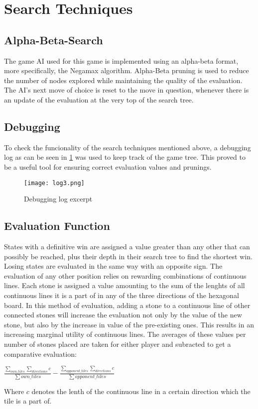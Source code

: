 \section{Search Techniques}

\subsection{Alpha-Beta-Search}
The game AI used for this game is implemented using an alpha-beta format, more specifically, the Negamax algorithm. Alpha-Beta pruning is used to reduce the number of nodes explored while maintaining the quality of the evaluation. The AI's next move of choice is reset to the move in question, whenever there is an update of the evaluation at the very top of the search tree.

\subsection{Debugging}
To check the funcionality of the search techniques mentioned above, a debugging log as can be seen in \ref{fig:debugging} was used to keep track of the game tree. This proved to be a useful tool for ensuring correct evaluation values and prunings.
\begin{figure}[h]
    \centering
    \texttt{[image: log3.png]}
    \caption{Debugging log excerpt}
    \label{fig:debugging}
\end{figure}  

\subsection{Evaluation Function}
States with a definitive win are assigned a value greater than any other that can possibly be reached, plus their depth in their search tree to find the shortest win. Losing states are evaluated in the same way with an opposite sign. The evaluation of any other position relies on rewarding combinations of continuous lines. Each stone is assigned a value amounting to the sum of the lenghts of all continuous lines it is a part of in any of the three directions of the hexagonal board. In this method of evaluation, adding a stone to a continuous line of other connected stones will increase the evaluation not only by the value of the new stone, but also by the increase in value of the pre-existing ones. This results in an increasing marginal utility of continuous lines. The averages of these values per number of stones placed are taken for either player and subracted to get a comparative evaluation:
\begin{center}
    \begin{math}
        \frac{\sum_{own\_tiles}\sum_{directions}c}{\sum{own\_tiles}} 
        - \frac{\sum_{opponent\_tiles}\sum_{directions}c}{\sum{opponent\_tiles}}
    \end{math}
\end{center}
Where $c$ denotes the lenth of the continuous line in a certain direction which the tile is a part of.

